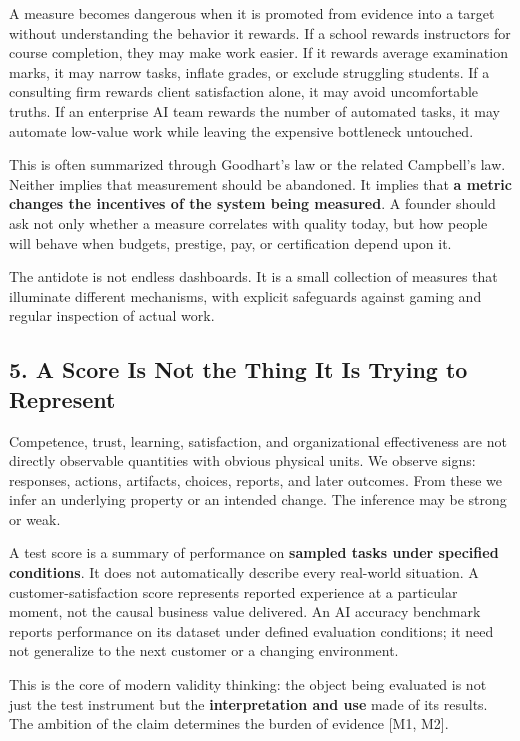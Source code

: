 A measure becomes dangerous when it is promoted from evidence into a target without understanding the behavior it rewards. If a school rewards instructors for course completion, they may make work easier. If it rewards average examination marks, it may narrow tasks, inflate grades, or exclude struggling students. If a consulting firm rewards client satisfaction alone, it may avoid uncomfortable truths. If an enterprise AI team rewards the number of automated tasks, it may automate low-value work while leaving the expensive bottleneck untouched.

This is often summarized through Goodhart's law or the related Campbell's law. Neither implies that measurement should be abandoned. It implies that \textbf{a metric changes the incentives of the system being measured}. A founder should ask not only whether a measure correlates with quality today, but how people will behave when budgets, prestige, pay, or certification depend upon it.

The antidote is not endless dashboards. It is a small collection of measures that illuminate different mechanisms, with explicit safeguards against gaming and regular inspection of actual work.

\subsection*{5. A Score Is Not the Thing It Is Trying to Represent}

Competence, trust, learning, satisfaction, and organizational effectiveness are not directly observable quantities with obvious physical units. We observe signs: responses, actions, artifacts, choices, reports, and later outcomes. From these we infer an underlying property or an intended change. The inference may be strong or weak.

A test score is a summary of performance on \textbf{sampled tasks under specified conditions}. It does not automatically describe every real-world situation. A customer-satisfaction score represents reported experience at a particular moment, not the causal business value delivered. An AI accuracy benchmark reports performance on its dataset under defined evaluation conditions; it need not generalize to the next customer or a changing environment.

This is the core of modern validity thinking: the object being evaluated is not just the test instrument but the \textbf{interpretation and use} made of its results. The ambition of the claim determines the burden of evidence [M1, M2].

